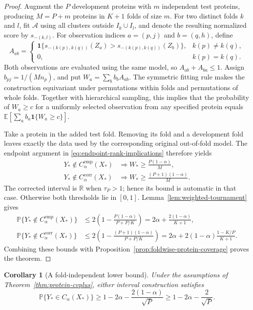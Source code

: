 \documentclass[11pt]{article}
\newtheorem{corollary}{Corollary}
\begin{document}
\begin{proof}
Augment the $P$ development proteins with $m$ independent test proteins, producing $M=P+m$ proteins in $K+1$ folds of size $m$. For two distinct folds $k$ and $l$, fit $\mathcal A$ using all clusters outside $I_k\cup I_l$, and denote the resulting normalized score by $s_{-(k,l)}$. For observation indices $a=(p,j)$ and $b=(q,h)$, define
\[
 A_{ab}=\begin{cases}
 \mathbf1\{s_{-(k(p),k(q))}(Z_a)
                >s_{-(k(p),k(q))}(Z_b)\},&k(p)\ne k(q),\\
 0,&k(p)=k(q).
 \end{cases}
\]
Both observations are evaluated using the same model, so $A_{ab}+A_{ba}\leq1$. Assign $b_{pj}=1/(Mn_p)$, and put $W_a=\sum_bb_bA_{ab}$. The symmetric fitting rule makes the construction equivariant under permutations within folds and permutations of whole folds. Together with hierarchical sampling, this implies that the probability of $W_a\geq c$ for a uniformly selected observation from any specified protein equals
$\mathbb E[\sum_ab_a\mathbf1\{W_a\geq c\}]$.

Take a protein in the added test fold. Removing its fold and a development fold leaves exactly the data used by the corresponding original out-of-fold model. The endpoint argument in \eqref{eq:endpoint-rank-implications} therefore yields
\begin{align*}
 Y_*\notin C_{\alpha}^{\mathrm{emp}}(X_*)
 &\Longrightarrow W_*\geq\frac{P(1-\alpha)}{M},\\
 Y_*\notin C_{\alpha}^{\mathrm{corr}}(X_*)
 &\Longrightarrow W_*\geq\frac{(P+1)(1-\alpha)}{M}.
\end{align*}
The corrected interval is $\mathbb R$ when $\tau_P>1$; hence its bound is automatic in that case. Otherwise both thresholds lie in $[0,1]$. Lemma~\ref{lem:weighted-tournament} gives
\begin{align*}
 \mathbb P\{Y_*\notin C_{\alpha}^{\mathrm{emp}}(X_*)\}
 &\leq2\left(1-\frac{P(1-\alpha)}{P+P/K}\right)
 =2\alpha+\frac{2(1-\alpha)}{K+1},\\
 \mathbb P\{Y_*\notin C_{\alpha}^{\mathrm{corr}}(X_*)\}
 &\leq2\left(1-\frac{(P+1)(1-\alpha)}{P+P/K}\right)
 =2\alpha+2(1-\alpha)\frac{1-K/P}{K+1}.
\end{align*}
Combining these bounds with Proposition~\ref{prop:foldwise-protein-coverage} proves the theorem.
\end{proof}

\begin{corollary}[A fold-independent lower bound]
\label{cor:protein-square-root-bound}
Under the assumptions of Theorem~\ref{thm:protein-cvplus}, either interval construction satisfies
\begin{equation}
 \mathbb P\{Y_*\in C_\alpha(X_*)\}
 \geq1-2\alpha-\frac{2(1-\alpha)}{\sqrt P}
 \geq1-2\alpha-\frac2{\sqrt P}.
 \label{eq:protein-square-root-bound}
\end{equation}
\end{corollary}
\end{document}
